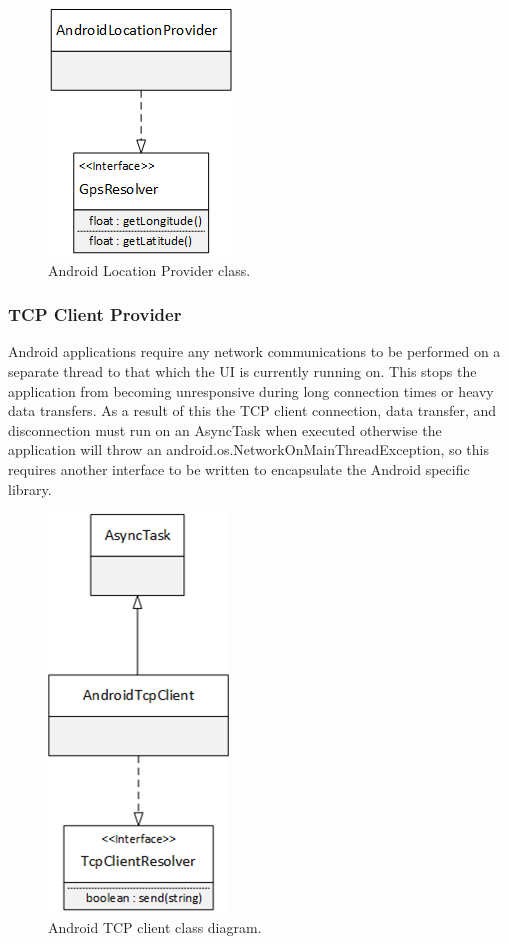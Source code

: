 \begin{figure}[h!]
\centering\includegraphics{design/figures/ag-lp-cd.png}
\caption{Android Location Provider class.}
\end{figure}

\subsubsection{TCP Client Provider}
\label{design:ag-tcp-1}
Android applications require any network communications to be performed on a separate thread to that which the UI is currently running on. This stops the application from becoming unresponsive during long connection times or heavy data transfers. As a result of this the TCP client connection, data transfer, and disconnection must run on an AsyncTask when executed otherwise the application will throw an android.os.NetworkOnMainThreadException, so this requires another interface to be written to encapsulate the Android specific library. 

\begin{figure}[h!]
\centering\includegraphics{design/figures/tcp-cd.png}
\caption{Android TCP client class diagram.}
\end{figure}

